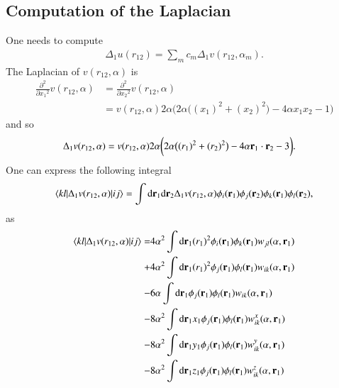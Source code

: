 \documentclass[aip,jcp,reprint,noshowkeys,superscriptaddress]{revtex4-1}
\newcommand{\matelem}[3]{\langle #1 | #2 | #3 \rangle}
\newcommand{\deriv}[3]{\frac{\partial^{#3} #1}{\partial {#2}^{#3}}}
\newcommand{\bri}[1]{{\bf r}_{#1}}
\begin{document}
\subsection{Computation of the Laplacian}
One needs to compute 
\begin{equation}
 \begin{aligned}
  \Delta_1 u(r_{12}) = \sum_{m} c_m \Delta_1  v(r_{12},\alpha_m).
 \end{aligned}
\end{equation}
The Laplacian of $v(r_{12},\alpha)$ is 
\begin{equation}
 \begin{aligned}
 \deriv{}{x_1}{2} v(r_{12},\alpha) &= \deriv{}{x_2}{2} v(r_{12},\alpha) \\
                           &= v(r_{12},\alpha) 2 \alpha \bigg( 2 \alpha \big( (x_1)^2 + (x_2)^2 \big) -4 \alpha x_1 x_2  -1\bigg)
 \end{aligned}
\end{equation}
and so 
\begin{equation}
 \begin{aligned}
 \Delta_1 v(r_{12},\alpha) &= v(r_{12},\alpha) 2 \alpha \bigg( 2 \alpha \big( (r_1)^2 + (r_2)^2 \big) -4 \alpha \bri{1}\cdot \bri{2}  -3\bigg).
 \end{aligned}
\end{equation}
One can express the following integral 
\begin{equation}
 \matelem{kl}{\Delta_1 v(r_{12},\alpha)}{ij} = \int \text{d}\bri{1}  \text{d}\bri{2} \Delta_1 v(r_{12},\alpha) 
\phi_i(\bri{1}) \phi_j(\bri{2}) \phi_k(\bri{1}) \phi_l(\bri{2}),
\end{equation}
as 
\begin{equation}
 \begin{aligned}
  \matelem{kl}{\Delta_1 v(r_{12},\alpha)}{ij} =&  4 \alpha^2 \int \text{d}\bri{1} (r_1)^2 \phi_i(\bri{1}) \phi_k(\bri{1}) w_{jl}(\alpha,\bri{1})  \\
                                               +& 4 \alpha^2 \int \text{d}\bri{1} (r_1)^2 \phi_j(\bri{1}) \phi_l(\bri{1}) w_{ik}(\alpha,\bri{1})  \\
                                               -& 6 \alpha \int \text{d}\bri{1} \phi_j(\bri{1}) \phi_l(\bri{1}) w_{ik}(\alpha,\bri{1})  \\
                                               -& 8 \alpha^2 \int \text{d}\bri{1} x_1 \phi_j(\bri{1}) \phi_l(\bri{1}) w_{ik}^x(\alpha,\bri{1})  \\
                                               -& 8 \alpha^2 \int \text{d}\bri{1} y_1 \phi_j(\bri{1}) \phi_l(\bri{1}) w_{ik}^y(\alpha,\bri{1})  \\
                                               -& 8 \alpha^2 \int \text{d}\bri{1} z_1 \phi_j(\bri{1}) \phi_l(\bri{1}) w_{ik}^z(\alpha,\bri{1})  \\
 \end{aligned}
\end{equation}
\end{document}
